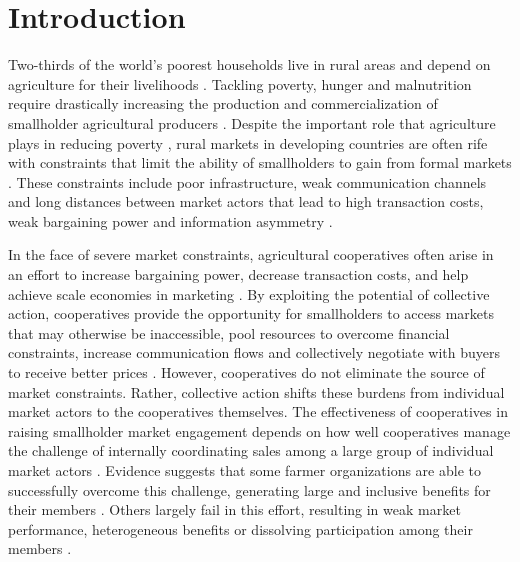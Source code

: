 \documentclass[11pt]{article}
\begin{document}
\clearpage
\renewcommand{\cftsecleader}{\cftdotfill{\cftdotsep}}


\doublespacing
\thispagestyle{plain}
\setcounter{page}{1}

\section{Introduction} \label{sec:intro}
Two-thirds of the world's poorest households live in rural areas and depend on agriculture for their livelihoods \citep{k_fuglie_harvesting_2019}. Tackling poverty, hunger and malnutrition require drastically increasing the production and commercialization of smallholder agricultural producers \citep{fischer_smallholder_2014,world_bank_world_2008}. Despite the important role that agriculture plays in reducing poverty \citep{k_fuglie_harvesting_2019}, rural markets in developing countries are often rife with constraints that limit the ability of smallholders to gain from formal markets \citep{ashby_investing_nodate,p_kristjanson_notitle_2014}. These constraints include poor infrastructure, weak communication channels and long distances between market actors that lead to high transaction costs, weak bargaining power and information asymmetry \citep{aker_information_2010,barrett_smallholder_2008,key_transactions_2000,staal_smallholder_1997}. 

In the face of severe market constraints, agricultural cooperatives often arise in an effort to increase bargaining power, decrease transaction costs, and help achieve scale economies in marketing \citep{markelova_collective_2010,rondot_agricultural_2001,staal_smallholder_1997,csaki_reaching_2003}. By exploiting the potential of collective action, cooperatives provide the opportunity for smallholders to access markets that may otherwise be inaccessible, pool resources to overcome financial constraints, increase communication flows and collectively negotiate with buyers to receive better prices \citep{poole_review_2010}. However, cooperatives do not eliminate the source of market constraints. Rather, collective action shifts these burdens from individual market actors to the cooperatives themselves. The effectiveness of cooperatives in raising smallholder market engagement depends on how well cooperatives manage the challenge of internally coordinating sales among a large group of individual market actors \citep{mullally_impact_2020}. Evidence suggests that some farmer organizations are able to successfully overcome this challenge, generating large and inclusive benefits for their members \citep{narrod_publicprivate_2009,tadesse_mobile_2015,wollni_farmers_2007}. Others largely fail in this effort, resulting in weak market performance, heterogeneous benefits or dissolving participation among their members \citep{aflagah_cheap_2019,bernard_reaching_2009, casaburi_loyalty_2015}. 
\end{document}
